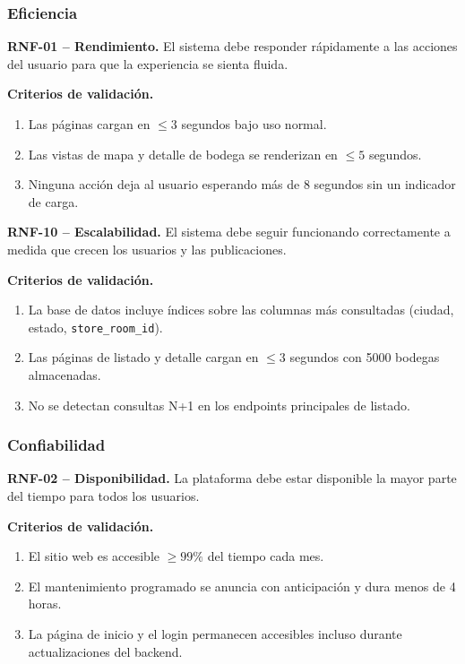 \subsubsection*{Eficiencia}

\textbf{RNF-01 -- Rendimiento.} \label{req:RNF-01}
El sistema debe responder rápidamente a las acciones del usuario para que la experiencia se sienta fluida.

\textbf{Criterios de validación.}
\begin{enumerate}
\item Las páginas cargan en $\leq 3$ segundos bajo uso normal.
\item Las vistas de mapa y detalle de bodega se renderizan en $\leq 5$ segundos.
\item Ninguna acción deja al usuario esperando más de 8 segundos sin un indicador de carga.
\end{enumerate}

\textbf{RNF-10 -- Escalabilidad.} \label{req:RNF-10}
El sistema debe seguir funcionando correctamente a medida que crecen los usuarios y las publicaciones.

\textbf{Criterios de validación.}
\begin{enumerate}
\item La base de datos incluye índices sobre las columnas más consultadas (ciudad, estado, \texttt{store\_room\_id}).
\item Las páginas de listado y detalle cargan en $\leq 3$ segundos con 5000 bodegas almacenadas.
\item No se detectan consultas N+1 en los endpoints principales de listado.
\end{enumerate}

\subsubsection*{Confiabilidad}

\textbf{RNF-02 -- Disponibilidad.} \label{req:RNF-02}
La plataforma debe estar disponible la mayor parte del tiempo para todos los usuarios.

\textbf{Criterios de validación.}
\begin{enumerate}
\item El sitio web es accesible $\geq 99\%$ del tiempo cada mes.
\item El mantenimiento programado se anuncia con anticipación y dura menos de 4 horas.
\item La página de inicio y el login permanecen accesibles incluso durante actualizaciones del backend.
\end{enumerate}

